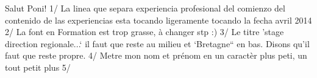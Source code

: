 Salut Poni! 
1/ La linea que separa experiencia profesional del comienzo del contenido de las experiencias esta tocando ligeramente tocando la fecha avril 2014
2/ La font en Formation est trop grasse, à changer stp :)
3/ Le titre 'stage direction regionale...` il faut que reste au milieu et `Bretagne`` en bas. Disons qu'il faut que reste propre. 
4/ Metre mon nom et prénom en un caractèr plus peti, un tout petit plus
5/ 